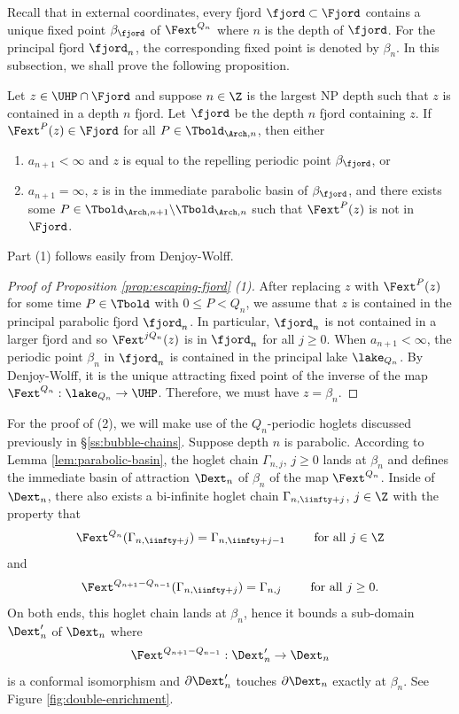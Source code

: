 \documentclass{amsart}
\begin{document}
Recall that in external coordinates, every fjord $\fjord \subset \Fjord$ contains a unique fixed point $\beta_{\fjord}$ of $\Fext^{Q_n}$ where $n$ is the depth of $\fjord$.
For the principal fjord $\fjord_n$, the corresponding fixed point is denoted by $\beta_n$.
In this subsection, we shall prove the following proposition.

\begin{proposition}
\label{prop:escaping-fjord}
    Let $z \in \UHP \cap \Fjord$ and suppose $n \in \Z$ is the largest NP depth such that $z$ is contained in a depth $n$ fjord.
    Let $\fjord$ be the depth $n$ fjord containing $z$.
    If $\Fext^P(z) \in \Fjord$ for all $P \in \Tbold_{\Arch,n}$, then either
    \begin{enumerate}
        \item $a_{n+1} < \infty$ and $z$ is equal to the repelling periodic point $\beta_\fjord$, or
        \item $a_{n+1} = \infty$, $z$ is in the immediate parabolic basin of $\beta_\fjord$, and there exists some $P \in \Tbold_{\Arch,n+1} \backslash \Tbold_{\Arch,n}$ such that $\Fext^{P}(z)$ is not in $\Fjord$.
    \end{enumerate}
\end{proposition}

Part (1) follows easily from Denjoy-Wolff.

\begin{proof}[Proof of Proposition \ref{prop:escaping-fjord} \textnormal{(1)}]
    After replacing $z$ with $\Fext^P(z)$ for some time $P \in \Tbold$ with $0 \leq P < Q_n$, we assume that $z$ is contained in the principal parabolic fjord $\fjord_n$.
    In particular, $\fjord_n$ is not contained in a larger fjord and so $\Fext^{jQ_n}(z)$ is in $\fjord_n$ for all $j \geq 0$.
    When $a_{n+1}<\infty$, the periodic point $\beta_n$ in $\fjord_n$ is contained in the principal lake $\lake_{Q_n}$.
    By Denjoy-Wolff, it is the unique attracting fixed point of the inverse of the map $\Fext^{Q_n}: \lake_{Q_n} \to \UHP$.
    Therefore, we must have $z = \beta_n$.
\end{proof}

For the proof of (2), we will make use of the $Q_n$-periodic hoglets discussed previously in \S\ref{ss:bubble-chains}. 
Suppose depth $n$ is parabolic. 
According to Lemma \ref{lem:parabolic-basin}, 
the hoglet chain $\Gamma_{n,j}$, $j \geq 0$ lands at $\beta_n$ and defines the immediate basin of attraction $\Dext_n$ of $\beta_n$ of the map $\Fext^{Q_n}$. 
Inside of $\Dext_n$, there also exists a bi-infinite hoglet chain $\Gamma_{n,\iinfty+j}$, $j \in \Z$ with the property that 
\[
    \Fext^{Q_n}(\Gamma_{n,\iinfty+j}) = \Gamma_{n,\iinfty+j-1}
    \qquad \text{ for all } j \in \Z
\]
and
\[
    \Fext^{Q_{n+1}-Q_{n-1}}(\Gamma_{n,\iinfty+j}) = \Gamma_{n,j}
    \qquad \text{ for all } j \geq 0.
\]
On both ends, this hoglet chain lands at $\beta_n$, hence it bounds a sub-domain $\Dext'_n$ of $\Dext_n$ where
\[
    \Fext^{Q_{n+1}-Q_{n-1}}: \Dext'_n \to \Dext_n
\]
is a conformal isomorphism and $\partial \Dext'_n$ touches $\partial \Dext_n$ exactly at $\beta_n$. 
See Figure \ref{fig:double-enrichment}.
\end{document}
